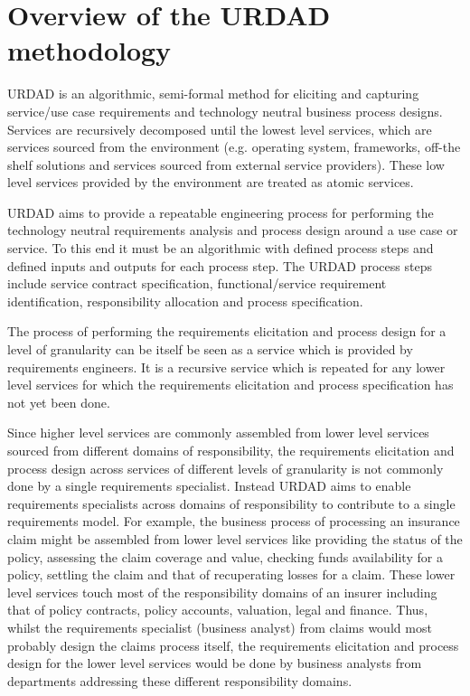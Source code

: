 \section{Overview of the URDAD methodology \label{sec:urdadMethodology}}

URDAD is an algorithmic, semi-formal method for eliciting and capturing service/use case requirements and technology neutral business process designs\cite{solms_urdad_2010}. Services are recursively decomposed until the lowest level services, which are services sourced from the environment (e.g. operating system, frameworks, off-the shelf solutions and services sourced from external service providers). These low level services provided by the environment are treated as atomic services.

URDAD aims to provide a repeatable engineering process for performing the technology neutral requirements analysis and process design around a use case or service. To this end it must be an algorithmic with defined process steps and defined inputs and outputs for each process step. The URDAD process steps include service contract specification, functional/service requirement identification, responsibility allocation and process specification.

The process of performing the requirements elicitation and process design for a level of granularity can be itself be seen as a service which is provided by requirements engineers. It is a recursive service which is repeated for any lower level services for which the requirements elicitation and process specification has not yet been done.

Since higher level services are commonly assembled from lower level services sourced from different domains of responsibility, the requirements elicitation and process design across services of different levels of granularity is not commonly done by a single requirements specialist. Instead URDAD aims to enable requirements specialists across domains of responsibility to contribute to a single requirements model. For example, the business process of processing an insurance claim might be assembled from lower level services like providing the status of the policy, assessing the claim coverage and value, checking funds availability for a policy, settling the claim and that of recuperating losses for a claim. These lower level services touch most of the responsibility domains of an insurer including that of policy contracts, policy accounts, valuation, legal and finance. Thus, whilst the requirements specialist (business analyst) from claims would most probably design the claims process itself, the requirements elicitation and process design for the lower level services would be done by business analysts from departments addressing these different responsibility domains. 

